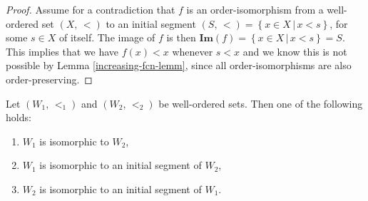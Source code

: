 \documentclass[../../main.tex]{subfiles}
\begin{document}
\begin{proof}
    Assume for a contradiction that $f$ is an order-isomorphism from a well-ordered set $\left(X,\, <\right)$ to an initial segment $\left(S,\, <\right) = \left\{x \in X \,\vert\, x < s\right\}$, for some $s \in X$ of itself.
    The image of $f$ is then $\mathbf{Im}\left(f\right) = \left\{x \in X \,\vert\, x < s\right\} = S$.
    This implies that we have $f(x) < x$ whenever $s < x$ and we know this is not possible by Lemma \ref{increasing-fcn-lemm}, since all order-isomorphisms are also order-preserving.
\end{proof}

\begin{theorem}\label{well-order-isomorphism}\cite[Theorem 1]{Jec78}
    Let $(W_1,\, <_1)$ and $(W_2,\, <_2)$ be well-ordered sets.
    Then one of the following holds:
    \begin{enumerate}
        \item $W_1$ is isomorphic to $W_2$,
        \item $W_1$ is isomorphic to an initial segment of $W_2$,
        \item $W_2$ is isomorphic to an initial segment of $W_1$.
    \end{enumerate}
\end{theorem}
\end{document}
